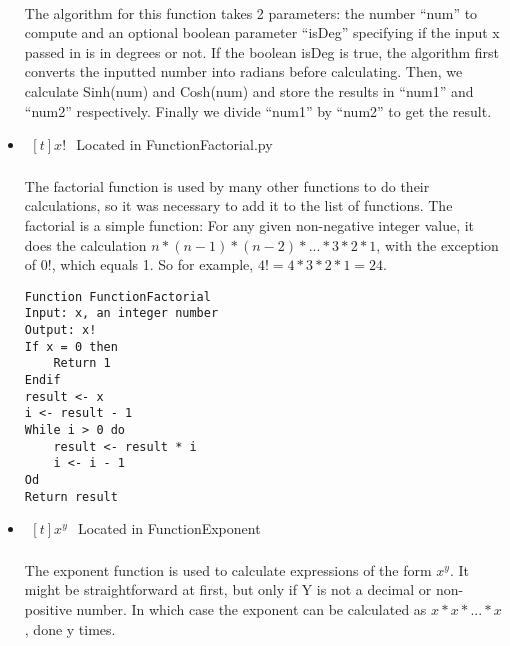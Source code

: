 \begin{itemize}
            \paragraph{}
            The algorithm for this function takes 2 parameters: the number “num” to compute and an optional boolean parameter “isDeg” specifying if the input x passed in is in degrees or not. If the boolean isDeg is true, the algorithm first converts the inputted number into radians before calculating. Then, we calculate Sinh(num) and Cosh(num) and store the results in “num1” and “num2” respectively.  Finally we divide “num1” by “num2” to get the result.

        \item $\begin{aligned}[t]
            x!
        \end{aligned}$
            Located in FunctionFactorial.py

            \paragraph{}
            The factorial function is used by many other functions to do their calculations, so it was necessary to add it to the list of functions. The factorial is a simple function: For any given non-negative integer value, it does the calculation $n*(n-1)*(n-2)*...*3*2*1$, with the exception of $0!$, which equals 1. So for example, $4! = 4*3*2*1 = 24$.

            \begin{lstlisting}
Function FunctionFactorial
Input: x, an integer number
Output: x!
If x = 0 then
	Return 1
Endif
result <- x
i <- result - 1
While i > 0 do
	result <- result * i
	i <- i - 1
Od
Return result
            \end{lstlisting}

        \item $\begin{aligned}[t]
            x^y
        \end{aligned}$
            Located in FunctionExponent

            \paragraph{}
            The exponent function is used to calculate expressions of the form $x^y$. It might be straightforward at first, but only if Y is not a decimal or non-positive number. In which case the exponent can be calculated as $x*x*...*x$, done y times.


\end{itemize}
